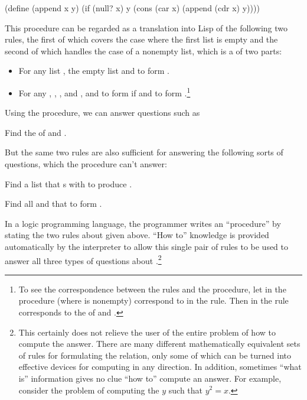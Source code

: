 \begin{codeBlock}

(define (append x y)
  (if (null? x) y (cons (car x) (append (cdr x) y))))
\end{codeBlock}

\noindent
This procedure can be regarded as a translation into Lisp of the following two
rules, the first of which covers the case where the first list is empty and the
second of which handles the case of a nonempty list, which is a  of
two parts:

\begin{itemize}
\item
For any list , the empty list and   to form
.

\item
For any , , , and ,  and
  to form  if  and 
 to form .\footnote{To see the correspondence between the
rules and the procedure, let  in the procedure (where  is
nonempty) correspond to  in the rule.  Then  in the
rule corresponds to the  of  and .}
\end{itemize}

\noindent
Using the  procedure, we can answer questions such as

\begin{niceQuote}
Find the  of  and .
\end{niceQuote}

\noindent
But the same two rules are also sufficient for answering the following sorts of
questions, which the procedure can't answer:

\begin{niceQuote}
Find a list  that s with  to produce .

Find all  and  that  to form .
\end{niceQuote}

\noindent
In a logic programming language, the programmer writes an 
``procedure'' by stating the two rules about  given above.  ``How
to'' knowledge is provided automatically by the interpreter to allow this
single pair of rules to be used to answer all three types of questions about
.\footnote{This certainly does not relieve the user of the entire
problem of how to compute the answer.  There are many different mathematically
equivalent sets of rules for formulating the  relation, only some
of which can be turned into effective devices for computing in any direction.
In addition, sometimes ``what is'' information gives no clue ``how to'' compute
an answer.  For example, consider the problem of computing the \( y \) such that
\( y^2 = x \).}

